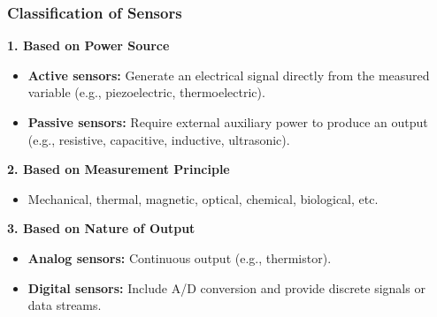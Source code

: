 \begin{frame}
	\frametitle{Classification of Sensors}
    \textbf{1. Based on Power Source}
    \begin{itemize}
        \item \textbf{Active sensors:} Generate an electrical signal directly from the measured variable (e.g., piezoelectric, thermoelectric).
        \item \textbf{Passive sensors:} Require external auxiliary power to produce an output (e.g., resistive, capacitive, inductive, ultrasonic).
    \end{itemize}
    \vspace{2mm}
    \textbf{2. Based on Measurement Principle}
    \begin{itemize}
        \item Mechanical, thermal, magnetic, optical, chemical, biological, etc.
    \end{itemize}
    \vspace{2mm}
    \textbf{3. Based on Nature of Output}
    \begin{itemize}
        \item \textbf{Analog sensors:} Continuous output (e.g., thermistor).
        \item \textbf{Digital sensors:} Include A/D conversion and provide discrete signals or data streams.
    \end{itemize}
\end{frame}
